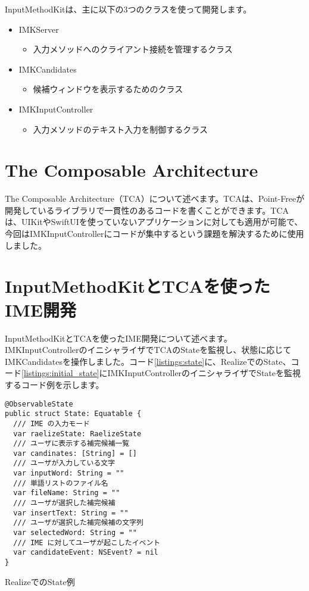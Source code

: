 \documentclass[uplatex,a4j,12pt,twocolumn]{jsarticle}
\begin{document}
InputMethodKitは、主に以下の3つのクラスを使って開発します。
\begin{itemize}
    \item IMKServer
    \begin{itemize}
        \item 入力メソッドへのクライアント接続を管理するクラス\cite{bib:imkserver}
    \end{itemize}
    \newpage
    \item IMKCandidates
    \begin{itemize}
        \item 候補ウィンドウを表示するためのクラス\cite{bib:imk_candidates}
    \end{itemize}
    \item IMKInputController
    \begin{itemize}
        \item 入力メソッドのテキスト入力を制御するクラス\cite{bib:imk_input_controller}
    \end{itemize}
\end{itemize}


\section{The Composable Architecture}\label{sec:the_composable_architecture}
The Composable Architecture（TCA）について述べます。TCAは、Point-Freeが開発しているライブラリで一貫性のあるコードを書くことができます。TCAは、UIKitやSwiftUIを使っていないアプリケーションに対しても適用が可能で、今回はIMKInputControllerにコードが集中するという課題を解決するために使用しました。

\section{InputMethodKitとTCAを使ったIME開発}\label{sec:use_imk_and_tca}
InputMethodKitとTCAを使ったIME開発について述べます。IMKInputControllerのイニシャライザでTCAのStateを監視し、状態に応じてIMKCandidatesを操作しました。コード\ref{listings:state}に、RealizeでのState、コード\ref{listings:initial_state}にIMKInputControllerのイニシャライザでStateを監視するコード例を示します。

\begin{listing}[h]
  \begin{verbatim}
@ObservableState
public struct State: Equatable {
  /// IME の入力モード
  var raelizeState: RaelizeState
  /// ユーザに表示する補完候補一覧
  var candinates: [String] = []
  /// ユーザが入力している文字
  var inputWord: String = ""
  /// 単語リストのファイル名
  var fileName: String = ""
  /// ユーザが選択した補完候補
  var insertText: String = ""
  /// ユーザが選択した補完候補の文字列
  var selectedWord: String = ""
  /// IME に対してユーザが起こしたイベント
  var candidateEvent: NSEvent? = nil
}
  \end{verbatim}
  \caption{RealizeでのState例}\label{listings:state}
\end{listing}
\end{document}
